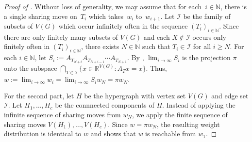 \documentclass[reqno, 12pt]{amsart}
\numberwithin{equation}{section}
\numberwithin{figure}{section}
\theoremstyle{plain}
\theoremstyle{definition}
\let\emptyset=\varnothing
\let\setminus=\smallsetminus
\newcommand{\tony}[1]{{\color{blue} T: #1}}
\begin{document}
\begin{proof}[Proof of ]
    Without loss of generality, we may assume that for each~${i \in \mathbb{N}}$, there is a single sharing move on~$T_{i}$ which takes~$w_i$ to~$w_{i+1}$.  Let $\mathcal{I}$ be the family of subsets of $V(G)$ which occur infinitely often in the sequence $(T_{i})_{i \in \mathbb{N}}$.    Since there are only finitely many subsets of $V(G)$ and each $X \notin \mathcal{I}$ occurs only finitely often in $(T_{i})_{i \in \mathbb{N}}$, there exists $N \in \mathbb{N}$ such that $T_i \in \mathcal{I}$  for all $i \geq N$. 
    For each $i \in \mathbb{N}$, let $S_i:=A_{T_{N+i}}A_{T_{N+i-1}}\cdots A_{T_{N+1}}$.  By , $\lim_{i \to \infty} S_i$ is the projection $\pi$ onto the subspace $\bigcap_{T \in \mathcal{I}} \{x\in\mathbb{R}^{V(G)}: A_{T}x=x\}$. 
    Thus, $w:=\lim_{i \to \infty} w_i=\lim_{i \to \infty} S_iw_N=\pi w_N$.
    
    For the second part, let $H$ be the hypergraph with vertex set $V(G)$ and edge set $\mathcal{I}$. Let $H_1, \dots, H_c$ be the connnected components of $H$.  Instead of applying the infinite sequence of sharing moves from $w_N$, 
        we apply the finite sequence of sharing moves $V(H_1), \dots, V(H_c)$. Since $w=\pi w_N$, the resulting weight distribution is identical to $w$ and shows that $w$ is reachable from $w_1$.  
\end{proof}


\end{document}
